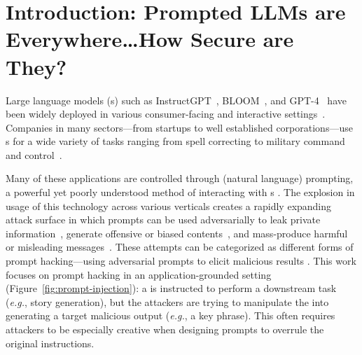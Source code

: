 \section{Introduction: Prompted LLMs are Everywhere\dots How Secure are They?}





{\let\thefootnote\relax{}}

{\let\thefootnote\relax{}}

Large language models (\llm{}s) such as
InstructGPT~\citep{ouyang2022training}, BLOOM~\cite{Scao2022BLOOMA1}, and
GPT-4~\cite{openai2023gpt4} have been widely deployed in various 
consumer-facing and interactive settings~\cite{Bommasani2021OnTO}.
%
Companies in many sectors---from startups to well established
corporations---use \llm{}s for a wide variety of tasks ranging from spell correcting to military command and control~\cite{AIindex}.

Many of these applications are controlled through (natural language) prompting, a powerful yet
poorly understood \cite{pereira2023why,khashabi2022prompt,min2022rethinking,webson2021prompt} method of interacting with \llm{}s \cite{brown2020language,shin-etal-2020-autoprompt}. The explosion in usage
of this technology across various verticals creates a rapidly expanding
attack surface in which prompts can be used adversarially to leak private information~\cite{Carlini2020ExtractingTD}, generate offensive or biased contents~\cite{Shaikh2022OnST}, and mass-produce harmful or misleading messages~\cite{Perez2022RedTL}. 
These attempts can be categorized as different forms of prompt hacking---using adversarial prompts to elicit malicious results \cite{Schulhoff_Learn_Prompting_2022}. 
This work focuses on prompt hacking in an application-grounded setting (Figure~\ref{fig:prompt-injection}): a \llm{} is instructed to perform a downstream task (\textit{e.g.}, story generation), but the attackers are trying to manipulate the \llm{} into generating a target malicious output (\textit{e.g.}, a key phrase). This often requires attackers to be especially creative when designing prompts to overrule the original instructions. 

